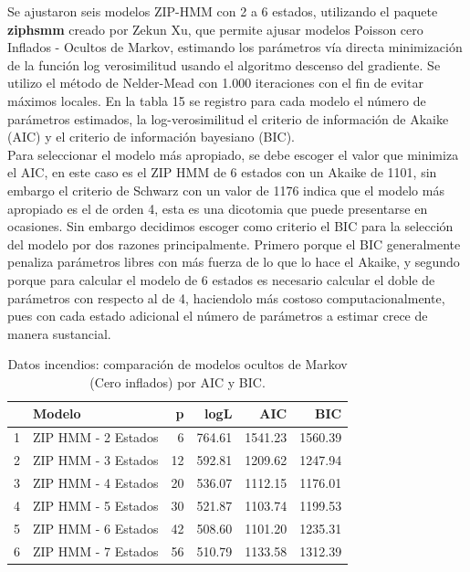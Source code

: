 \documentclass[a4paper]{article}\usepackage[]{graphicx}\usepackage[]{color}
\begin{document}
Se ajustaron seis modelos ZIP-HMM con 2 a 6 estados, utilizando el paquete \textbf{ziphsmm} creado por Zekun Xu, que permite ajusar modelos Poisson cero Inflados - Ocultos de Markov, estimando los parámetros vía directa minimización de la función log verosimilitud usando el algoritmo descenso del gradiente. Se utilizo el método de Nelder-Mead con 1.000 iteraciones con el fin de evitar máximos locales. En la tabla 15 se registro para cada modelo el número de parámetros estimados, la log-verosimilitud el criterio de información de Akaike (AIC) y el criterio de información bayesiano (BIC).
\\
Para seleccionar el modelo más apropiado, se debe escoger el valor que minimiza el AIC, en este caso es el ZIP HMM de 6 estados con un Akaike de 1101, sin embargo el criterio de Schwarz con un valor de 1176 indica que el modelo más apropiado es el de orden 4, esta es una dicotomia que puede presentarse en ocasiones. Sin embargo decidimos escoger como criterio el BIC para la selección del modelo por dos razones principalmente. Primero porque el BIC generalmente penaliza parámetros libres con más fuerza de lo que lo hace el Akaike, y segundo porque para calcular el modelo de 6 estados es necesario calcular el doble de parámetros con respecto al de 4, haciendolo más costoso computacionalmente, pues con cada estado adicional el número de parámetros a estimar crece de manera sustancial.



\begin{table}[ht]
\centering
\begin{tabular}{rlrrrr}
  \hline
 & Modelo & p & logL & AIC & BIC \\ 
  \hline
1 & ZIP HMM - 2 Estados &   6 & 764.61 & 1541.23 & 1560.39 \\ 
  2 & ZIP HMM - 3 Estados &  12 & 592.81 & 1209.62 & 1247.94 \\ 
  3 & ZIP HMM - 4 Estados &  20 & 536.07 & 1112.15 & 1176.01 \\ 
  4 & ZIP HMM - 5 Estados &  30 & 521.87 & 1103.74 & 1199.53 \\ 
  5 & ZIP HMM - 6 Estados &  42 & 508.60 & 1101.20 & 1235.31 \\ 
  6 & ZIP HMM - 7 Estados &  56 & 510.79 & 1133.58 & 1312.39 \\ 
   \hline
\end{tabular}
\caption{Datos incendios: comparación de modelos ocultos de Markov (Cero inflados) por AIC y BIC.} 
\end{table}
\end{document}

